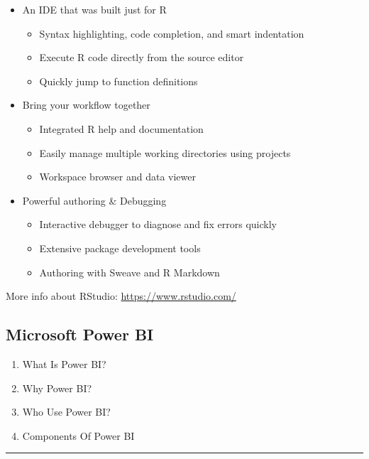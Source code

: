 \documentclass[]{book}
\providecommand{\tightlist}{%
  \setlength{\itemsep}{0pt}\setlength{\parskip}{0pt}}
\begin{document}
\begin{itemize}
\tightlist
\item
  An IDE that was built just for R

  \begin{itemize}
  \tightlist
  \item
    Syntax highlighting, code completion, and smart indentation
  \item
    Execute R code directly from the source editor
  \item
    Quickly jump to function definitions
  \end{itemize}
\item
  Bring your workflow together

  \begin{itemize}
  \tightlist
  \item
    Integrated R help and documentation
  \item
    Easily manage multiple working directories using projects
  \item
    Workspace browser and data viewer
  \end{itemize}
\item
  Powerful authoring \& Debugging

  \begin{itemize}
  \tightlist
  \item
    Interactive debugger to diagnose and fix errors quickly
  \item
    Extensive package development tools
  \item
    Authoring with Sweave and R Markdown
  \end{itemize}
\end{itemize}

More info about RStudio: \url{https://www.rstudio.com/}

\subsection{Microsoft Power BI}\label{microsoft-power-bi}

\begin{enumerate}
\def\labelenumi{\arabic{enumi}.}
\tightlist
\item
  What Is Power BI?
\item
  Why Power BI?
\item
  Who Use Power BI?
\item
  Components Of Power BI
\end{enumerate}

\begin{center}\rule{0.5\linewidth}{\linethickness}\end{center}
\end{document}
